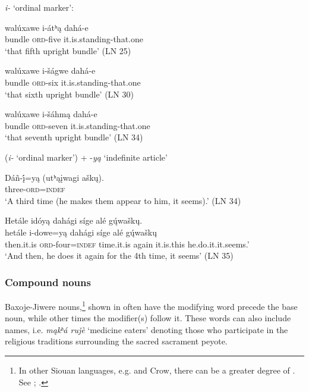 \documentclass[output=paper]{LSP/langsci}
\begin{document}
\begin{exe}
\ex  \textit{i-} `ordinal marker': \citep[``The Giant'' Bk2]{Marsh1936}
\begin{xlist}	
\ex 
\gll  walúxawe i-átʰ\k{a}  dahá-e   \\
bundle      \textsc{ord}-five     it.is.standing-that.one \\
\trans `that fifth upright bundle' (LN 25) 
			
\ex 
\gll  walúxawe i-\v{s}ágwe dahá-e  \\
bundle      \textsc{ord}-six     it.is.standing-that.one \\
\trans `that sixth upright bundle' (LN 30)

\ex 
\gll walúxawe  i-\v{s}áhm\k{a}  dahá-e \\  
bundle     \textsc{ord}-seven    it.is.standing-that.one \\
\trans {}`that seventh upright bundle' (LN 34)
\end{xlist}
\ex (\textit{i-} `ordinal marker') + -\textit{y\k{a}} `indefinite article' \citep[``The Wanderer'']{Marsh1936}
\begin{xlist}
\ex \gll Dáñ-\k{\'i}=y\k{a}     (utʰ\k{a}\k{i}wagi  a\v{s}k\k{u}).   \\
	three-\textsc{ord}=\textsc{indef} {} {} \\
\trans `A third time (he makes them appear to him, it seems).'	 (LN 34)  
		 
\ex 
\glll Hetále    idóy\k{a} dahági   s\'ige   alé   g\k{ú}wa\v{s}k\k{u}. \\
hetále i-dowe=y\k{a}  dahági s\'ige   alé   g\k{ú}wa\v{s}k\k{u} \\		   
then.it.is \textsc{ord}-four=\textsc{indef} time.it.is  again it.is.this he.do.it.it.seems.' \\ 
\trans `And then, he does it again for the 4th time, it seems' (LN 35)
\end{xlist}
\end{exe}
\subsubsection{Compound nouns} 
Baxoje-Jiwere  nouns,\footnote{In other Siouan languages, e.g.  and Crow, there can be a greater degree of . See \citet[738]{Ullrich2008}; \citet{DeReuse1994,Graczyk1991a}.} shown in  often have the modifying word precede the base noun, while other times the modifier(s) follow it. These words can also include names, i.e. \textit{m\k{a}kʰá  ru\v{j}\`e} `medicine eaters' denoting those who participate in the religious traditions surrounding the sacred sacrament peyote.  
\end{document}
